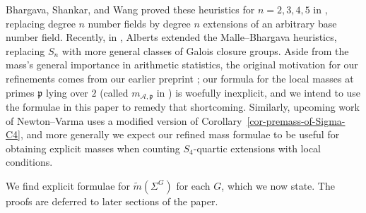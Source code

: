 \documentclass[11pt]{amsart}
\theoremstyle{theorem}
\theoremstyle{example}
\theoremstyle{definition}
\numberwithin{theorem}{section}
\numberwithin{theorem}{section}
\newcommand{\p}{\mathfrak{p}}
\newcommand{\m}{\widetilde{m}}
\begin{document}
Bhargava, Shankar, and Wang proved these heuristics for $n=2,3,4,5$ in \cite[Theorem~2]{bhargava-shankar-wang}, replacing degree $n$ number fields by degree $n$ extensions of an arbitrary base number field. Recently, in \cite{alberts2023random}, Alberts extended the Malle--Bhargava heuristics, replacing $S_n$ with more general classes of Galois closure groups. Aside from the mass's general importance in arithmetic statistics, the original motivation for our refinements comes from our earlier preprint \cite{monnet-S4-quartics}; our formula for the local masses at primes $\p$ lying over $2$ (called $m_{\mathcal{A},\p}$ in \cite{monnet-S4-quartics}) is woefully inexplicit, and we intend to use the formulae in this paper to remedy that shortcoming. Similarly, upcoming work of Newton--Varma uses a modified version of Corollary~\ref{cor-premass-of-Sigma-C4}, and more generally we expect our refined mass formulae to be useful for obtaining explicit masses when counting $S_4$-quartic extensions with local conditions.  

We find explicit formulae for $\m(\Sigma^{G})$ for each $G$, which we now state. The proofs are deferred to later sections of the paper. 
\end{document}
